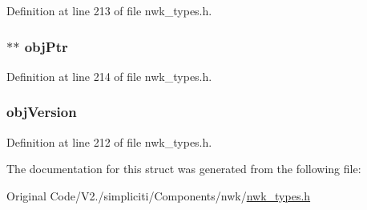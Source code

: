 \-Definition at line 213 of file nwk\-\_\-types.\-h.

\hypertarget{structioctlNVObj__t_a949432122afe3e9a023a8ffb333e81d4}{
\subsubsection[{obj\-Ptr}]{$\ast$$\ast$ {\bf obj\-Ptr}}}\label{structioctlNVObj__t_a949432122afe3e9a023a8ffb333e81d4}


\-Definition at line 214 of file nwk\-\_\-types.\-h.

\hypertarget{structioctlNVObj__t_a822a4cb6fbb3487cd295d0620a299c02}{
\subsubsection[{obj\-Version}]{ {\bf obj\-Version}}}\label{structioctlNVObj__t_a822a4cb6fbb3487cd295d0620a299c02}


\-Definition at line 212 of file nwk\-\_\-types.\-h.



\-The documentation for this struct was generated from the following file\-:\begin{DoxyCompactItemize}
\item 
\-Original Code/\-V2./simpliciti/\-Components/nwk/\hyperlink{nwk__types_8h}{nwk\-\_\-types.\-h}\end{DoxyCompactItemize}
